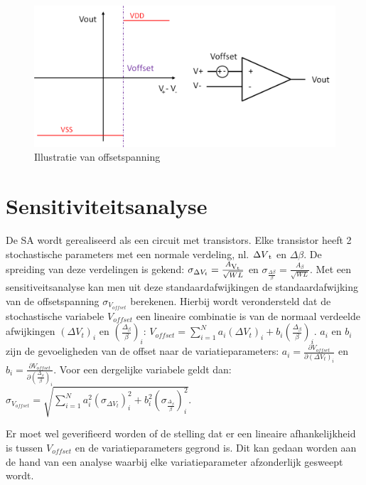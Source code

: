 \begin{figure}
  \centering
  \includegraphics[scale=0.4]{../fig/hfdstk-sensamp-offset.png}
  \caption{Illustratie van offsetspanning}
  \label{fig:offset}
\end{figure}

\section{Sensitiviteitsanalyse}
De SA wordt gerealiseerd als een circuit met transistors. Elke transistor heeft 2 stochastische parameters met een normale verdeling, nl. $\Delta V\textsubscript{t}$ en $\Delta \beta$. De spreiding van deze verdelingen is gekend: $\sigma_{\Delta V_{t}} = \frac{A\textsubscript{V\textsubscript{t}}}{\sqrt{W L}}$ en $\sigma_\frac{{\Delta \beta}}{\beta} = \frac{A_{\beta}}{\sqrt{W L}}$. Met een sensitiveitsanalyse kan men uit deze standaardafwijkingen de standaardafwijking van de offsetspanning $\sigma_{V_{offset}}$ berekenen. Hierbij wordt verondersteld dat de stochastische variabele $V_{offset}$ een lineaire combinatie is van de normaal verdeelde afwijkingen $(\Delta V_{t})_{i}$ en $(\frac{\Delta_{\beta}}{\beta})_{i}$: $V_{offset}=\sum\limits_{i=1}^{N} a_{i} (\Delta V_{t})_{i} + b_{i} (\frac{\Delta_{\beta}}{\beta})_{i}$.
$a_{i}$ en $b_{i}$ zijn de gevoeligheden van de offset naar de variatieparameters: $a_{i}=\frac{\partial V_{offset}}{\partial (\Delta V_{t})_{i}}$ en $b_{i}=\frac{\partial V_{offset}}{\partial (\frac{\Delta_{\beta}}{\beta})_{i}}$.
Voor een dergelijke variabele geldt dan: $\sigma_{V_{offset}}=\sqrt{\sum\limits_{i=1}^{N} a_{i}^{2} (\sigma_{\Delta V_{t}})_{i}^{2} + b_{i}^{2} (\sigma_{\frac{\Delta_{\beta}}{\beta}})_{i}^{2}}$.

Er moet wel geverifieerd worden of de stelling dat er een lineaire afhankelijkheid is tussen $V_{offset}$ en de variatieparameters gegrond is.
Dit kan gedaan worden aan de hand van een analyse waarbij elke variatieparameter afzonderlijk gesweept wordt. 

